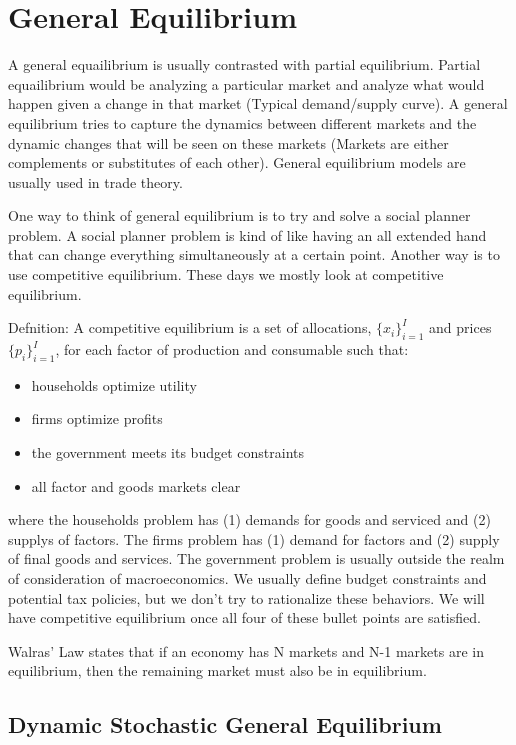\documentclass[a4paper]{article}
\begin{document}
\section{General Equilibrium}

A general equailibrium is usually contrasted with partial equilibrium. Partial equailibrium would be analyzing a particular market and analyze what would happen given a change in that market (Typical demand/supply curve). A general equilibrium tries to capture the dynamics between different markets and the dynamic changes that will be seen on these markets (Markets are either complements or substitutes of each other). General equilibrium models are usually used in trade theory.


One way to think of general equilibrium is to try and solve a social planner problem. A social planner problem is kind of like having an all extended hand that can change everything simultaneously at a certain point. Another way is to use competitive equilibrium. These days we mostly look at competitive equilibrium.


Defnition: A competitive equilibrium is a set of allocations, $\{x_i\}_{i=1}^I$ and prices $\{p_i\}_{i=1}^I$, for each factor of production and consumable such that:

\begin{itemize}
\item households optimize utility
\item firms optimize profits
\item the government meets its budget constraints
\item all factor and goods markets clear
\end{itemize}

where the households problem has (1) demands for goods and serviced and (2) supplys of factors. The firms problem  has (1) demand for factors and (2) supply of final goods and services. The government problem is usually outside the realm of consideration of macroeconomics. We usually define budget constraints and potential tax policies, but we don't try to rationalize these behaviors. We will have competitive equilibrium once all four of these bullet points are satisfied.

Walras' Law states that if an economy has N markets and N-1 markets are in equilibrium, then the remaining market must also be in equilibrium.

\subsection{Dynamic Stochastic General Equilibrium}
\end{document}

